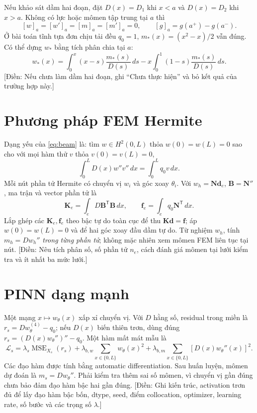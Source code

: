\documentclass[12pt,a4paper]{article}
\newcommand{\todo}[1]{\textcolor{red!70!black}{[Điền: #1]}}
\begin{document}
Nếu khảo sát dầm hai đoạn, đặt $D(x)=D_1$ khi $x<a$ và $D(x)=D_2$ khi $x>a$. Không có lực hoặc mômen tập trung tại $a$ thì
\begin{equation}\label{eq:interface}
  [w]_a=[w']_a=[m]_a=[m']_a=0,\qquad [g]_a=g(a^+)-g(a^-).
\end{equation}
Ở bài toán tĩnh tựa đơn chịu tải đều $q_0=1$, $m_*(x)=(x^2-x)/2$ vẫn đúng. Có thể dựng $w_*$ bằng tích phân chia tại $a$:
\begin{equation}\label{eq:reference}
 w_*(x)=\int_0^x(x-s)\frac{m_*(s)}{D(s)}\,ds
 -x\int_0^1(1-s)\frac{m_*(s)}{D(s)}\,ds.
\end{equation}
\todo{Nếu chưa làm dầm hai đoạn, ghi ``Chưa thực hiện'' và bỏ kết quả của trường hợp này.}

\section{Phương pháp FEM Hermite}
Dạng yếu của \eqref{eq:beam} là: tìm $w\in H^2(0,L)$ thỏa $w(0)=w(L)=0$ sao cho với mọi hàm thử $v$ thỏa $v(0)=v(L)=0$,
\begin{equation}\label{eq:weak}
  \int_0^L D(x)w''v''\,dx=\int_0^L q_0v\,dx.
\end{equation}
Mỗi nút phần tử Hermite có chuyển vị $w_i$ và góc xoay $\theta_i$. Với $w_h=\mathbf N\mathbf d_e$, $\mathbf B=\mathbf N''$, ma trận và vector phần tử là
\begin{equation}\label{eq:fem}
  \mathbf K_e=\int_e D\mathbf B^{\mathsf T}\mathbf B\,dx,\qquad
  \mathbf f_e=\int_e q_0\mathbf N^{\mathsf T}\,dx.
\end{equation}
Lắp ghép các $\mathbf K_e,\mathbf f_e$ theo bậc tự do toàn cục để thu $\mathbf K\mathbf d=\mathbf f$; áp $w(0)=w(L)=0$ và để hai góc xoay đầu dầm tự do. Từ nghiệm $w_h$, tính $m_h=Dw_h''$ \emph{trong từng phần tử}; không mặc nhiên xem mômen FEM liên tục tại nút. \todo{Nêu tích phân số, số phần tử $n_e$, cách đánh giá mômen tại lưới kiểm tra và ít nhất ba mức lưới.}

\section{PINN dạng mạnh}
Một mạng $x\mapsto w_\theta(x)$ xấp xỉ chuyển vị. Với $D$ hằng số, residual trong miền là $r_s=Dw_\theta^{(4)}-q_0$; nếu $D(x)$ biến thiên trơn, dùng đúng $r_s=(D(x)w_\theta'')''-q_0$. Một hàm mất mát mẫu là
\begin{equation}\label{eq:strongloss}
\mathcal L_s=\lambda_s\operatorname{MSE}_{X_s}(r_s)
+\lambda_{b,w}\sum_{x\in\{0,L\}}w_\theta(x)^2
+\lambda_{b,m}\sum_{x\in\{0,L\}}[D(x)w_\theta''(x)]^2.
\end{equation}
Các đạo hàm được tính bằng automatic differentiation. Sau huấn luyện, mômen dự đoán là $m_s=Dw_\theta''$. Phải kiểm tra thêm sai số mômen, vì chuyển vị gần đúng chưa bảo đảm đạo hàm bậc hai gần đúng. \todo{Ghi kiến trúc, activation trơn đủ để lấy đạo hàm bậc bốn, dtype, seed, điểm collocation, optimizer, learning rate, số bước và các trọng số $\lambda$.}
\end{document}

